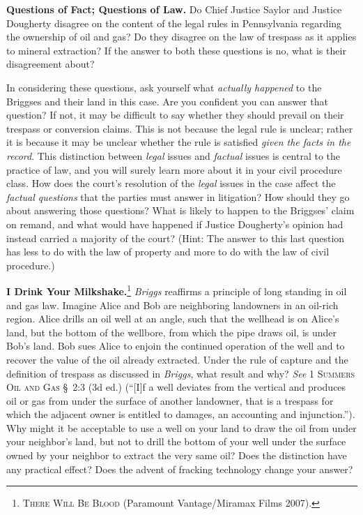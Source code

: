 
\item \textbf{Questions of Fact; Questions of Law.} Do Chief Justice Saylor and
Justice Dougherty disagree on the content of the legal rules in Pennsylvania
regarding the ownership of oil and gas? Do they disagree on the law of trespass
as it applies to mineral extraction? If the answer to both these questions is
no, what is their disagreement about?


In considering these questions, ask yourself what \textit{actually happened} to
the Briggses and their land in this case. Are you confident you can answer that
question? If not, it may be difficult to say whether they should prevail on
their trespass or conversion claims. This is not because the legal rule is
unclear; rather it is because it may be unclear whether the rule is satisfied
\textit{given the facts in the record}. This distinction between \textit{legal}
issues and \textit{factual} issues is central to the practice of law, and you
will surely learn more about it in your civil procedure class. How does the
court's resolution of the \textit{legal} issues in the case affect the
\textit{factual questions} that the parties must answer in litigation? How
should they go about answering those questions? What is likely to happen to the
Briggses' claim on remand, and what would have happened if Justice Dougherty's
opinion had instead carried a majority of the court? (Hint: The answer to this
last question has less to do with the law of property and more to do with the
law of civil procedure.)


\item \textbf{I Drink Your Milkshake.}\footnote{\textsc{There Will Be Blood}
(Paramount Vantage/Miramax Films 2007).} \textit{Briggs} reaffirms a principle
of long standing in oil and gas law. Imagine Alice and Bob are neighboring
landowners in an oil-rich region. Alice drills an oil well at an angle, such
that the wellhead is on Alice's land, but the bottom of the wellbore, from which
the pipe draws oil, is under Bob's land. Bob sues Alice to enjoin the continued
operation of the well and to recover the value of the oil already extracted.
Under the rule of capture and the definition of trespass as discussed in
\textit{Briggs}, what result and why? \textit{See} 1 \textsc{Summers}
\textsc{Oil and Gas} \S~2:3 (3d ed.) (``[I]f a well deviates from the vertical
and produces oil or gas from under the surface of another landowner, that is a
trespass for which the adjacent owner is entitled to damages, an accounting and
injunction.''). Why might it be acceptable to use a well on your land to draw
the oil from under your neighbor's land, but not to drill the bottom of your
well under the surface owned by your neighbor to extract the very same oil? Does
the distinction have any practical effect? Does the advent of fracking
technology change your answer?



